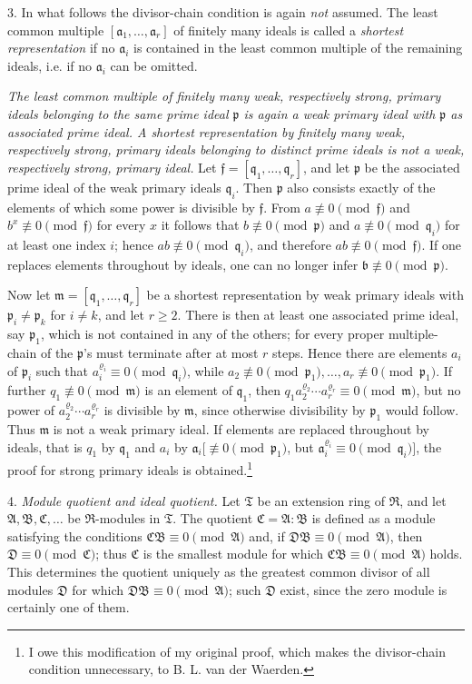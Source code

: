 \documentclass[11pt]{article}
\providecommand{\mR}{\mathfrak{R}}
\providecommand{\mT}{\mathfrak{T}}
\providecommand{\mA}{\mathfrak{A}}
\providecommand{\mB}{\mathfrak{B}}
\providecommand{\mC}{\mathfrak{C}}
\providecommand{\mD}{\mathfrak{D}}
\providecommand{\ma}{\mathfrak{a}}
\providecommand{\mb}{\mathfrak{b}}
\providecommand{\mf}{\mathfrak{f}}
\providecommand{\mm}{\mathfrak{m}}
\providecommand{\mpideal}{\mathfrak{p}}
\providecommand{\mq}{\mathfrak{q}}
\begin{document}
3. In what follows the divisor-chain condition is again \emph{not} assumed. The least common multiple $[\ma_1,
\ldots,\ma_r]$ of finitely many ideals is called a \emph{shortest representation} if no $\ma_i$ is contained in the least common multiple of the remaining ideals, i.e. if no $\ma_i$ can be omitted.

\emph{The least common multiple of finitely many weak, respectively strong, primary ideals belonging to the same prime ideal $\mpideal$ is again a weak primary ideal with $\mpideal$ as associated prime ideal. A shortest representation by finitely many weak, respectively strong, primary ideals belonging to distinct prime ideals is not a weak, respectively strong, primary ideal.} Let $\mf=[\mq_1,
\ldots,\mq_r]$, and let $\mpideal$ be the associated prime ideal of the weak primary ideals $\mq_i$. Then $\mpideal$ also consists exactly of the elements of which some power is divisible by $\mf$. From $a\not\equiv0\pmod{\mf}$ and $b^x\not\equiv0\pmod{\mf}$ for every $x$ it follows that $b\not\equiv0\pmod{\mpideal}$ and $a\not\equiv0\pmod{\mq_i}$ for at least one index $i$; hence $ab\not\equiv0\pmod{\mq_i}$, and therefore $ab\not\equiv0\pmod{\mf}$. If one replaces elements throughout by ideals, one can no longer infer $\mb\not\equiv0\pmod{\mpideal}$.

Now let $\mm=[\mq_1,
\ldots,\mq_r]$ be a shortest representation by weak primary ideals with $\mpideal_i\ne\mpideal_k$ for $i\ne k$, and let $r\ge2$. There is then at least one associated prime ideal, say $\mpideal_1$, which is not contained in any of the others; for every proper multiple-chain of the $\mpideal$'s must terminate after at most $r$ steps. Hence there are elements $a_i$ of $\mpideal_i$ such that $a_i^{\varrho_i}\equiv0\pmod{\mq_i}$, while $a_2\not\equiv0\pmod{\mpideal_1},
\ldots,a_r\not\equiv0\pmod{\mpideal_1}$. If further $q_1\not\equiv0\pmod{\mm}$ is an element of $\mq_1$, then $q_1a_2^{\varrho_2}\cdots a_r^{\varrho_r}\equiv0\pmod{\mm}$, but no power of $a_2^{\varrho_2}\cdots a_r^{\varrho_r}$ is divisible by $\mm$, since otherwise divisibility by $\mpideal_1$ would follow. Thus $\mm$ is not a weak primary ideal. If elements are replaced throughout by ideals, that is $q_1$ by $\mq_1$ and $a_i$ by $\ma_i[\not\equiv0\pmod{\mpideal_1}$, but $\ma_i^{\varrho_i}\equiv0\pmod{\mq_i}]$, the proof for strong primary ideals is obtained.\footnote{I owe this modification of my original proof, which makes the divisor-chain condition unnecessary, to B. L. van der Waerden.}

4. \emph{Module quotient and ideal quotient.} Let $\mT$ be an extension ring of $\mR$, and let $\mA,\mB,\mC,
\ldots$ be $\mR$-modules in $\mT$. The quotient $\mC=\mA:\mB$ is defined as a module satisfying the conditions $\mC\mB\equiv0\pmod{\mA}$ and, if $\mD\mB\equiv0\pmod{\mA}$, then $\mD\equiv0\pmod{\mC}$; thus $\mC$ is the smallest module for which $\mC\mB\equiv0\pmod{\mA}$ holds. This determines the quotient uniquely as the greatest common divisor of all modules $\mD$ for which $\mD\mB\equiv0\pmod{\mA}$; such $\mD$ exist, since the zero module is certainly one of them.
\end{document}
